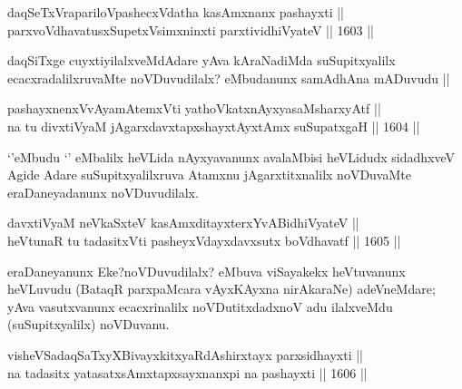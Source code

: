 \begin{shl}
daqSeTxVrapariloVpashecxVdatha kasAmxnanx pashayxti || \\
parxvoVdhavatusxSupetxV\s simxninxti parxtividhiVyateV ||  1603 || 
\end{shl}

\begin{artha}
daqSiTxge cuyxtiyilalxveMdAdare yAva kAraNadiMda suSupitxyalilx ecacxradalilxruvaMte noVDuvudilalx? eMbudanunx samAdhAna mADuvudu ||
\end{artha}

\begin{shl}
pashayxnenxVvAyamAtemxVti yathoVkatxnAyxyasaMsharxyAtf ||  \\
na tu divxtiVyaM jAgarxdavxtapxshayxtAyxtAmx suSupatxgaH ||  1604 ||  
\end{shl}

\begin{artha}
`\stext'eMbudu `\stext' eMbalilx heVLida nAyxyavanunx avalaMbisi heVLidudx sidadhxveV Agide Adare suSupitxyalilxruva Atamxnu jAgarxtitxnalilx noVDuvaMte eraDaneyadanunx noVDuvudilalx.
\end{artha}

\begin{shl}
davxtiVyaM neVkaSxteV kasAmxditayxterxYvABidhiVyateV || \\
heVtunaR tu tadasitxVti pasheyxVdayxdavxsutx boVdhavatf ||  1605 ||  
\end{shl}

\begin{artha}
eraDaneyanunx Eke?noVDuvudilalx? eMbuva viSayakekx heVtuvanunx heVLuvudu (BataqR parxpaMcara vAyxKAyxna nirAkaraNe) adeVneMdare; yAva vasutxvanunx ecacxrinalilx noVDutitxdadxnoV adu ilalxveMdu (suSupitxyalilx) noVDuvanu.
\end{artha}


\begin{shl}
visheVSadaqSaTxyXBivayxkitxyaRdAshirxtayx parxsidhayxti ||  \\
na tadasitx yatasatxsAmxtapxsayxnanxpi na pashayxti ||  1606 ||  
\end{shl}

